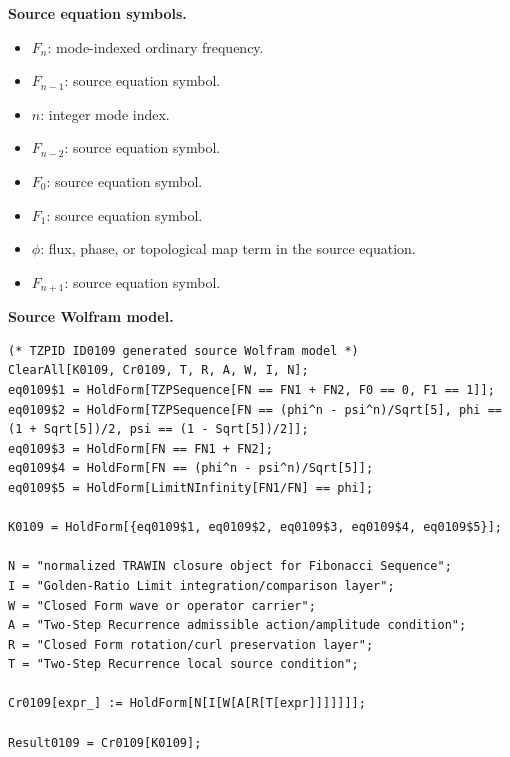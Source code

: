 \begin{minipage}[t]{0.49\linewidth}
\begingroup
\small
\raggedright
\textbf{Source equation symbols.}\par
\begin{itemize}[leftmargin=1.35em,itemsep=1pt,topsep=1pt,parsep=0pt]
    \item $F_n$: mode-indexed ordinary frequency.
    \item $F_{n-1}$: source equation symbol.
    \item $n$: integer mode index.
    \item $F_{n-2}$: source equation symbol.
    \item $F_0$: source equation symbol.
    \item $F_1$: source equation symbol.
    \item $\phi$: flux, phase, or topological map term in the source equation.
    \item $F_{n+1}$: source equation symbol.
\end{itemize}
\endgroup
\end{minipage}\hfill
\begin{minipage}[t]{0.47\linewidth}
\begingroup
\scriptsize
\raggedright
\textbf{Source Wolfram model.}\par
\begin{Verbatim}[fontsize=\tiny,breaklines=true,breakanywhere=true]
(* TZPID ID0109 generated source Wolfram model *)
ClearAll[K0109, Cr0109, T, R, A, W, I, N];
eq0109$1 = HoldForm[TZPSequence[FN == FN1 + FN2, F0 == 0, F1 == 1]];
eq0109$2 = HoldForm[TZPSequence[FN == (phi^n - psi^n)/Sqrt[5], phi == (1 + Sqrt[5])/2, psi == (1 - Sqrt[5])/2]];
eq0109$3 = HoldForm[FN == FN1 + FN2];
eq0109$4 = HoldForm[FN == (phi^n - psi^n)/Sqrt[5]];
eq0109$5 = HoldForm[LimitNInfinity[FN1/FN] == phi];

K0109 = HoldForm[{eq0109$1, eq0109$2, eq0109$3, eq0109$4, eq0109$5}];

N = "normalized TRAWIN closure object for Fibonacci Sequence";
I = "Golden-Ratio Limit integration/comparison layer";
W = "Closed Form wave or operator carrier";
A = "Two-Step Recurrence admissible action/amplitude condition";
R = "Closed Form rotation/curl preservation layer";
T = "Two-Step Recurrence local source condition";

Cr0109[expr_] := HoldForm[N[I[W[A[R[T[expr]]]]]]];

Result0109 = Cr0109[K0109];
\end{Verbatim}
\endgroup
\end{minipage}

